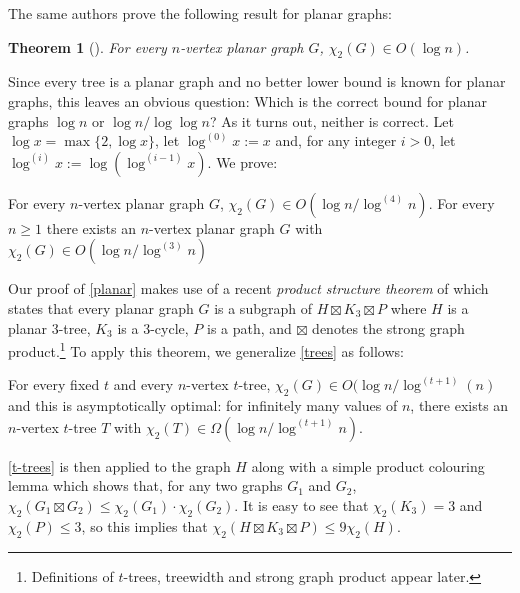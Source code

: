 \documentclass[kpfonts]{patmorin}
\newcommand{\uqs}{\chi_2}
\newtheorem{othertheorem}{Theorem}
\theoremstyle{named}
\begin{document}
The same authors prove the following result for planar graphs:

\setcounter{othertheorem}{15}
\begin{othertheorem}[\cite{karpas.neiman.ea:on}]\label{planar-graphs}
    For every $n$-vertex planar graph $G$, $\uqs(G)\in O(\log n)$.
\end{othertheorem}

Since every tree is a planar graph and no better lower bound is known for planar graphs, this leaves an obvious question:  Which is the correct bound for planar graphs $\log n$ or $\log n/\log\log n$?  As it turns out, neither is correct.  Let $\log x =\max\{2,\log x\}$, let $\log^{(0)}x:=x$ and, for any integer $i>0$, let $\log^{(i)}x:=\log(\log^{(i-1)} x)$. We prove:


\begin{thm}\label{planar}
    For every $n$-vertex planar graph $G$, $\uqs(G)\in O(\log n/\log^{(4)} n)$.  For every $n\ge 1$ there exists an $n$-vertex planar graph $G$ with $\uqs(G)\in O(\log n/\log^{(3)} n)$
\end{thm}

Our proof of \cref{planar} makes use of a recent \emph{product structure theorem} of \citet{dujmovic.joret.ea:planar} which states that every planar graph $G$ is a subgraph of $H\boxtimes K_3\boxtimes P$ where $H$ is a planar $3$-tree, $K_3$ is a 3-cycle, $P$ is a path, and $\boxtimes$ denotes the strong graph product.\footnote{Definitions of $t$-trees, treewidth and strong graph product appear later.}  To apply this theorem, we generalize \cref{trees} as follows:

\begin{thm}\label{t-trees}
    For every fixed $t$ and every $n$-vertex $t$-tree, $\uqs(G) \in O(\log n/\log^{(t+1)}(n)$ and this is asymptotically optimal: for infinitely many values of $n$, there exists an $n$-vertex $t$-tree $T$ with $\uqs(T)\in\Omega(\log n/\log^{(t+1)} n)$.
\end{thm}

\cref{t-trees} is then applied to the graph $H$ along with a simple product colouring lemma which shows that, for any two graphs $G_1$ and $G_2$, $\uqs(G_1\boxtimes G_2)\le \uqs(G_1)\cdot\uqs(G_2)$. It is easy to see that $\uqs(K_3)=3$ and $\uqs(P)\le 3$, so this implies that $\uqs(H\boxtimes K_3\boxtimes P)\le 9\uqs(H)$.

\end{document}

